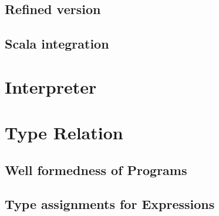 \subsection{Refined version}
\subsection{Scala integration}

\section{Interpreter}
\section{Type Relation}
\subsection{Well formedness of Programs}
\subsection{Type assignments for Expressions}

